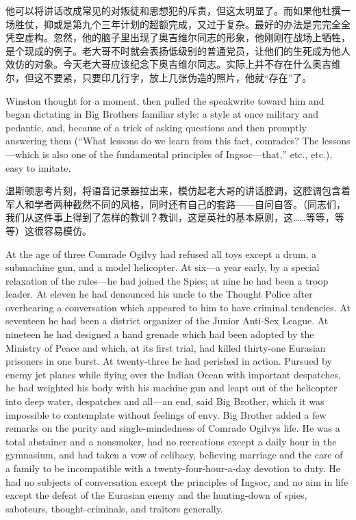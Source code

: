 \begin{paracol}{2}
\switchcolumn

他可以将讲话改成常见的对叛徒和思想犯的斥责，但这太明显了。而如果他杜撰一场胜仗，抑或是第九个三年计划的超额完成，又过于复杂。最好的办法是完完全全凭空虚构。忽然，他的脑子里出现了奥吉维尔同志的形象，他刚刚在战场上牺牲，是个现成的例子。老大哥不时就会表扬低级别的普通党员，让他们的生死成为他人效仿的对象。今天老大哥应该纪念下奥吉维尔同志。实际上并不存在什么奥吉维尔，但这不要紧，只要印几行字，放上几张伪造的照片，他就``存在''了。

\switchcolumn*

Winston thought for a moment, then pulled the speakwrite toward him and
began dictating in Big Brothers familiar style: a style at once military
and pedantic, and, because of a trick of asking questions and then
promptly answering them (``What lessons do we learn from this fact,
comrades? The lessons---which is also one of the fundamental principles
of Ingsoc---that,'' etc., etc.), easy to imitate.

\switchcolumn

温斯顿思考片刻，将语音记录器拉出来，模仿起老大哥的讲话腔调，这腔调包含着军人和学者两种截然不同的风格，同时还有自己的套路——自问自答。（同志们，我们从这件事上得到了怎样的教训？教训，这是英社的基本原则，这\ldots\ldots 等等，等等）这很容易模仿。

\switchcolumn*

At the age of three Comrade Ogilvy had refused all toys except a drum, a
submachine gun, and a model helicopter. At six---a year early, by a
special relaxation of the rules---he had joined the Spies; at nine he
had been a troop leader. At eleven he had denounced his uncle to the
Thought Police after overhearing a conversation which appeared to him to
have criminal tendencies. At seventeen he had been a district organizer
of the Junior Anti-Sex League. At nineteen he had designed a hand
grenade which had been adopted by the Ministry of Peace and which, at
its first trial, had killed thirty-one Eurasian prisoners in one burst.
At twenty-three he had perished in action. Pursued by enemy jet planes
while flying over the Indian Ocean with important despatches, he had
weighted his body with his machine gun and leapt out of the helicopter
into deep water, despatches and all---an end, said Big Brother, which it
was impossible to contemplate without feelings of envy. Big Brother
added a few remarks on the purity and single-mindedness of Comrade
Ogilvy\textquotesingle s life. He was a total abstainer and a nonsmoker,
had no recreations except a daily hour in the gymnasium, and had taken a
vow of celibacy, believing marriage and the care of a family to be
incompatible with a twenty-four-hour-a-day devotion to duty. He had no
subjects of conversation except the principles of Ingsoc, and no aim in
life except the defeat of the Eurasian enemy and the hunting-down of
spies, saboteurs, thought-criminals, and traitors generally.


\end{paracol}
